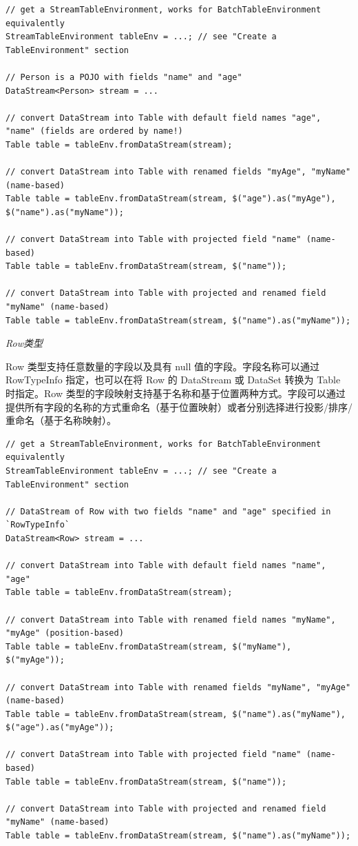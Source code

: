 \documentclass[cn,11pt,chinese]{elegantbook}
\begin{document}
\begin{verbatim}
// get a StreamTableEnvironment, works for BatchTableEnvironment equivalently
StreamTableEnvironment tableEnv = ...; // see "Create a TableEnvironment" section

// Person is a POJO with fields "name" and "age"
DataStream<Person> stream = ...

// convert DataStream into Table with default field names "age", "name" (fields are ordered by name!)
Table table = tableEnv.fromDataStream(stream);

// convert DataStream into Table with renamed fields "myAge", "myName" (name-based)
Table table = tableEnv.fromDataStream(stream, $("age").as("myAge"), $("name").as("myName"));

// convert DataStream into Table with projected field "name" (name-based)
Table table = tableEnv.fromDataStream(stream, $("name"));

// convert DataStream into Table with projected and renamed field "myName" (name-based)
Table table = tableEnv.fromDataStream(stream, $("name").as("myName"));
\end{verbatim}

\textit{Row类型}

Row 类型支持任意数量的字段以及具有 null 值的字段。字段名称可以通过 RowTypeInfo 指定，也可以在将 Row 的 DataStream 或 DataSet 转换为 Table 时指定。Row 类型的字段映射支持基于名称和基于位置两种方式。字段可以通过提供所有字段的名称的方式重命名（基于位置映射）或者分别选择进行投影/排序/重命名（基于名称映射）。

\begin{verbatim}
// get a StreamTableEnvironment, works for BatchTableEnvironment equivalently
StreamTableEnvironment tableEnv = ...; // see "Create a TableEnvironment" section

// DataStream of Row with two fields "name" and "age" specified in `RowTypeInfo`
DataStream<Row> stream = ...

// convert DataStream into Table with default field names "name", "age"
Table table = tableEnv.fromDataStream(stream);

// convert DataStream into Table with renamed field names "myName", "myAge" (position-based)
Table table = tableEnv.fromDataStream(stream, $("myName"), $("myAge"));

// convert DataStream into Table with renamed fields "myName", "myAge" (name-based)
Table table = tableEnv.fromDataStream(stream, $("name").as("myName"), $("age").as("myAge"));

// convert DataStream into Table with projected field "name" (name-based)
Table table = tableEnv.fromDataStream(stream, $("name"));

// convert DataStream into Table with projected and renamed field "myName" (name-based)
Table table = tableEnv.fromDataStream(stream, $("name").as("myName"));
\end{verbatim}
\end{document}
